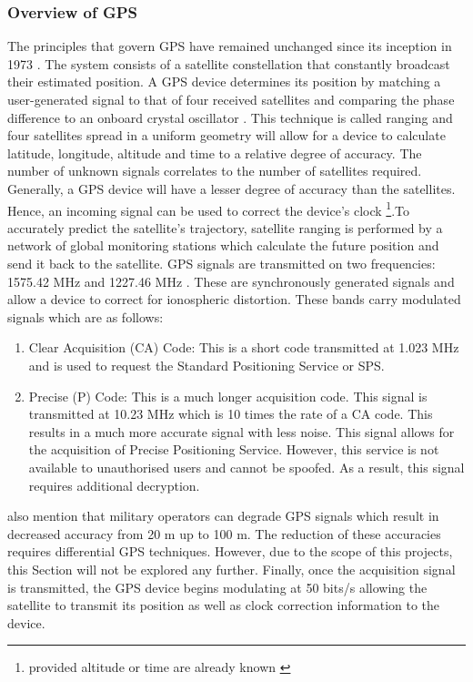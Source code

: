 \subsubsection{Overview of GPS}

The principles that govern GPS have remained unchanged since its inception in 1973 \cite{spilker1996global}. The system consists of a satellite constellation that constantly broadcast their estimated position. A GPS device determines its position by matching a user-generated signal to that of four received satellites and comparing the phase difference to an onboard crystal oscillator \cite{spilker1996global}. This technique is called ranging and four satellites spread in a uniform geometry will allow for a device to calculate latitude, longitude, altitude and time to a relative degree of accuracy. The number of unknown signals correlates to the number of satellites required. Generally, a GPS device will have a lesser degree of accuracy than the satellites. Hence, an incoming signal can be used to correct the device's clock \footnote{provided altitude or time are already known \cite{spilker1996global}}.To accurately predict the satellite's trajectory, satellite ranging is performed by a network of global monitoring stations which calculate the future position and send it back to the satellite. GPS signals are transmitted on two frequencies: 1575.42 MHz and 1227.46 MHz \cite{spilker1996global}. These are synchronously generated signals and allow a device to correct for ionospheric distortion. These bands carry modulated signals which are as follows: \cite{spilker1996global}


\begin{enumerate}
	\item Clear Acquisition (CA) Code:  This is a short code transmitted at 1.023 MHz and is used to request the Standard Positioning Service or SPS.
	\item Precise (P) Code: This is a much longer acquisition code. This signal is transmitted at 10.23 MHz which is 10 times the rate of a CA code. This results in a much more accurate signal with less noise. This signal allows for the acquisition of Precise Positioning Service. However, this service is not available to unauthorised users and cannot be spoofed. As a result, this signal requires additional decryption.    
\end{enumerate}

\textcite{spilker1996global} also mention that military operators can degrade GPS signals which result in decreased accuracy from 20 m up to 100 m. The reduction of these accuracies requires differential GPS techniques. However, due to the scope of this projects, this Section will not be explored any further. Finally, once the acquisition signal is transmitted, the GPS device begins modulating at 50 bits/s allowing the satellite to transmit its position as well as clock correction information to the device.\par

